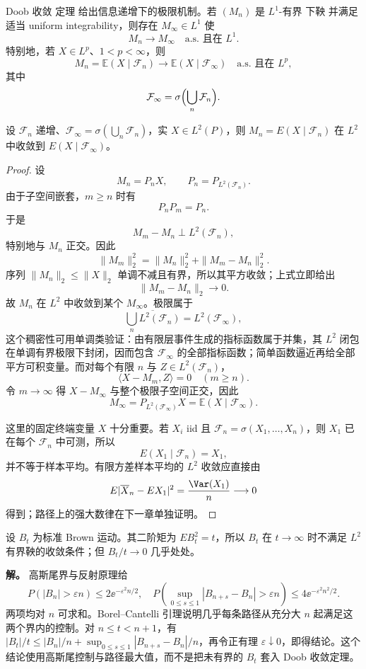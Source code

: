 Doob 收敛 定理 给出信息递增下的极限机制。若 $(M_n)$ 是 $L^1$-有界 下鞅 并满足适当 uniform integrability，则存在 $M_\infty\in L^1$ 使
\[
M_n\to M_\infty
\quad\text{a.s. 且在 }L^1.
\]
特别地，若 $X\in L^p$、$1<p<\infty$，则
\begin{equation*}M_n=\mathbb E(X\mid\mathcal F_n)
\longrightarrow
\mathbb E(X\mid\mathcal F_\infty)
\quad\text{a.s. 且在 }L^p,\end{equation*}
其中
\[
\mathcal F_\infty
=\sigma\Bigl(\bigcup_n\mathcal F_n\Bigr).
\]
\begin{proposition}[递增信息的平方可积投影极限]
设 $\mathcal F_n$ 递增、$\mathcal F_\infty=\sigma(\bigcup_n\mathcal F_n)$，实 $X\in L^2(P)$，则 $M_n=E(X\mid\mathcal F_n)$ 在 $L^2$ 中收敛到 $E(X\mid\mathcal F_\infty)$。
\end{proposition}
\begin{proof}
设
\[
M_n=P_nX,
\qquad
P_n=P_{L^2(\mathcal F_n)}.
\]
由于子空间嵌套，$m\ge n$ 时有
\[
P_nP_m=P_n.
\]
于是
\[
M_m-M_n
\perp L^2(\mathcal F_n),
\]
特别地与 $M_n$ 正交。因此
\[
\|M_m\|_2^2
=\|M_n\|_2^2+\|M_m-M_n\|_2^2.
\]
序列 $\|M_n\|_2\le\|X\|_2$ 单调不减且有界，所以其平方收敛；上式立即给出
\[
\|M_m-M_n\|_2\to0.
\]
故 $M_n$ 在 $L^2$ 中收敛到某个 $M_\infty$。极限属于
\[
\overline{\bigcup_nL^2(\mathcal F_n)}
=L^2(\mathcal F_\infty),
\]
这个稠密性可用单调类验证：由有限层事件生成的指标函数属于并集，其 $L^2$ 闭包在单调有界极限下封闭，因而包含 $\mathcal F_\infty$ 的全部指标函数；简单函数逼近再给全部平方可积变量。而对每个有限 $n$ 与 $Z\in L^2(\mathcal F_n)$，
\[
\langle X-M_m,Z\rangle=0
\quad(m\ge n).
\]
令 $m\to\infty$ 得 $X-M_\infty$ 与整个极限子空间正交，因此
\[
M_\infty=P_{L^2(\mathcal F_\infty)}X
=\mathbb E(X\mid\mathcal F_\infty).
\]

这里的固定终端变量 $X$ 十分重要。若 $X_i$ iid 且 $\mathcal F_n=\sigma(X_1,\ldots,X_n)$，则 $X_1$ 已在每个 $\mathcal F_n$ 中可测，所以
\[
E(X_1\mid\mathcal F_n)=X_1,
\]
并不等于样本平均。有限方差样本平均的 $L^2$ 收敛应直接由
\[
E|\overline X_n-EX_1|^2=\frac{\Var(X_1)}n\longrightarrow0
\]
得到；路径上的强大数律在下一章单独证明。

\end{proof}


\begin{example}
设 $B_t$ 为标准 Brown 运动。其二阶矩为 $EB_t^2=t$，所以 $B_t$ 在 $t\to\infty$ 时不满足 $L^2$ 有界鞅的收敛条件；但 $B_t/t\to0$ 几乎处处。

\textbf{解。} 高斯尾界与反射原理给
\[
P(|B_n|>\varepsilon n)\le2\ee^{-\varepsilon^2n/2},
\quad
P\!\left(\sup_{0\le s\le1}|B_{n+s}-B_n|>\varepsilon n\right)
\le4\ee^{-\varepsilon^2n^2/2}.
\]
两项均对 $n$ 可求和。Borel--Cantelli 引理说明几乎每条路径从充分大 $n$ 起满足这两个界内的控制。对 $n\le t<n+1$，有 $|B_t|/t\le|B_n|/n+\sup_{0\le s\le1}|B_{n+s}-B_n|/n$，再令正有理 $\varepsilon\downarrow0$，即得结论。这个结论使用高斯尾控制与路径最大值，而不是把未有界的 $B_t$ 套入 Doob 收敛定理。
\end{example}


